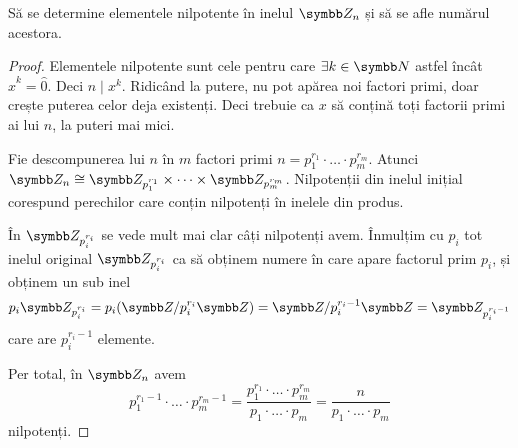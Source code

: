 \begin{exercise}[1.22]
Să se determine elementele nilpotente în inelul \(\integersmod{n}\) și să se afle numărul acestora.
\end{exercise}
\begin{proof}
Elementele nilpotente sunt cele pentru care \(\exists k \in \naturals\) astfel încât \(\widehat{x}^k = \widehat{0}\). Deci \(n \mid x^k\). Ridicând la putere, nu pot apărea noi factori primi, doar crește puterea celor deja existenți. Deci trebuie ca \(x\) să conțină toți factorii primi ai lui \(n\), la puteri mai mici.

Fie descompunerea lui \(n\) în \(m\) factori primi \(n = p_1^{r_1} \cdot \dots \cdot p_m^{r_m}\). Atunci \(\integersmod{n} \cong \integersmod{p_1^{r_1}} \times \dots \times \integersmod{p_m^{r_m}}\). Nilpotenții din inelul inițial corespund perechilor care conțin nilpotenți în inelele din produs.

În \(\integersmod{p_i^{r_i}}\) se vede mult mai clar câți nilpotenți avem. Înmulțim cu \(p_i\) tot inelul original \(\integersmod{p_i^{r_i}}\) ca să obținem numere în care apare factorul prim \(p_i\), și obținem un sub inel
\[
    p_i \integersmod{p_i^{r_i}} = p_i (\integers / {p_i^{r_i} \integers)} = \integers / {p_i^{r_i - 1} \integers} = \integersmod{p_i^{r_i - 1}}
\]
care are \(p_i^{r_i - 1}\) elemente.

Per total, în \(\integersmod{n}\) avem
\[
    p_1^{r_1 - 1} \cdot \dots \cdot p_m^{r_m - 1} = \frac{p_1^{r_1} \cdot \dots \cdot p_m^{r_m}}{p_1 \cdot \dots \cdot p_m} = \frac{n}{p_1 \cdot \dots \cdot p_m}
\]
nilpotenți.
\end{proof}

